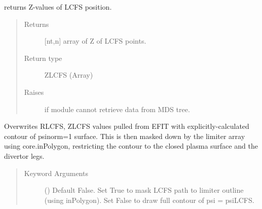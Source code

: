\documentclass[letterpaper,10pt,english]{sphinxmanual}
\begin{document}
\begin{fulllineitems}
\begin{fulllineitems}
\begin{quote}
\begin{description}
\end{description}\end{quote}

\end{fulllineitems}


\begin{fulllineitems}
\label{\detokenize{eqtools:eqtools.EFIT.EFITTree.getZLCFS}}
returns Z-values of LCFS position.
\begin{quote}\begin{description}
\item[{Returns}] \leavevmode
{[}nt,n{]} array of Z of LCFS points.

\item[{Return type}] \leavevmode
ZLCFS (Array)

\item[{Raises}] \leavevmode
{} \textendash{} if module cannot retrieve data from MDS tree.

\end{description}\end{quote}

\end{fulllineitems}


\begin{fulllineitems}
\label{\detokenize{eqtools:eqtools.EFIT.EFITTree.remapLCFS}}
Overwrites RLCFS, ZLCFS values pulled from EFIT with
explicitly-calculated contour of psinorm=1 surface.  This is then masked
down by the limiter array using core.inPolygon, restricting the contour
to the closed plasma surface and the divertor legs.
\begin{quote}\begin{description}
\item[{Keyword Arguments}] \leavevmode
{} () \textendash{} Default False.  Set True to mask LCFS path to
limiter outline (using inPolygon).  Set False to draw full
contour of psi = psiLCFS.


\end{description}
\end{quote}
\end{fulllineitems}
\end{fulllineitems}
\end{document}

